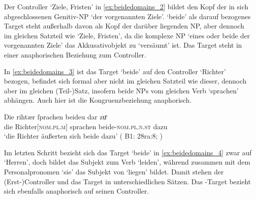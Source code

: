 
Der Controller  `Ziele, Fristen' in \cref{ex:beidedomains_2} bildet
den Kopf der in sich abgeschlossenen Genitiv-NP  `der
vorgenannten Ziele'.  `beide' als darauf bezogenes
Target steht außerhalb davon als Kopf der darüber liegenden NP, aber dennoch im
gleichen Satzteil wie  `Ziele, Fristen', da die komplexe NP
 `eines oder beide der
vorgenannten Ziele' das Akkusativobjekt zu  `versäumt'
ist. Das Target steht in einer anaphorischen Beziehung zum Controller.


In \cref{ex:beidedomains_3} ist das Target  `beide' auf den
Controller  `Richter' bezogen, befindet sich formal aber nicht im
gleichen Satzteil wie dieser, dennoch aber im gleichen (Teil-)Satz, insofern
beide NPs vom gleichen Verb  `sprachen' abhängen. Auch hier ist
die Kongruenzbeziehung anaphorisch.

\begin{exe}
\ex \label{ex:beidedomains_3}
	\gll Die rihtær ſprachen beideu {dar zuͦ} \\
		die Richter[\textsc{nom.pl.m}] sprachen beide-\textsc{nom.pl.n.st}
			dazu \\
	\trans `die Richter äußerten sich beide dazu'
		(%
			B1: 28ra:8;
			\cite[vgl.][267 {[=~V.~10090]}]{schroeder1895}%
		)
\end{exe}

Im letzten Schritt bezieht sich das Target  `beide' in
\cref{ex:beidedomains_4} zwar auf  `Herren', doch bildet
 das Subjekt zum Verb  `leiden', während
 zusammen mit dem Personalpronomen  `sie' das
Subjekt von  `liegen' bildet. Damit stehen der (Erst-)Controller
 und das Target  in unterschiedlichen Sätzen. Das
-Target bezieht sich ebenfalls anaphorisch auf seinen Controller.

